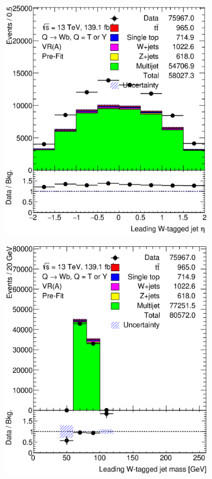 \begin{figure}[hbt!]
\begin{subfigure}{.35\textwidth}
		\includegraphics[width=\linewidth,height=\textheight,keepaspectratio]{VR_B_ljet_eta.eps}
		\caption{}
		\label{fig:abcd:estimate:ljet_eta}
	\end{subfigure}
	\begin{subfigure}{.35\textwidth}
		\centering
		\includegraphics[width=\linewidth,height=\textheight,keepaspectratio]{VR_B_ljet_m.eps}

\end{subfigure}
\end{figure}
